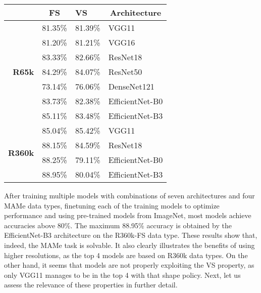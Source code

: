 \documentclass{article}
\begin{document}
\begin{table}[t]
\begin{minipage}{.49\linewidth}
\begin{tabular}{@{}r|l|l|l@{}}
                       & \multicolumn{1}{c}{\textbf{FS}} & \textbf{VS} & \multicolumn{1}{c}{\textbf{Architecture}}  \\ \midrule
\multirow{7}{*}{\textbf{R65k}}  & 81.35\%                     & 81.39\%          & VGG11                            \\
                                & 81.20\%                     & 81.21\%          & VGG16                            \\
                                & 83.33\%                     & 82.66\%          & ResNet18                         \\
                                & 84.29\%                     & 84.07\%          & ResNet50                         \\
                                & 73.14\%                     & 76.06\%          & DenseNet121                      \\
                                & 83.73\%                     & 82.38\%          & EfficientNet-B0                  \\
                                & 85.11\%                     & 83.48\%          & EfficientNet-B3                  \\ \midrule
\multirow{4}{*}{\textbf{R360k}} & 85.04\%                     & 85.42\%          & VGG11                            \\
                                & 88.15\%                     & 84.59\%          & ResNet18                         \\
                                & 88.25\%                     & 79.11\%          & EfficientNet-B0                  \\
                                & 88.95\%                     & 80.04\%          & EfficientNet-B3                                      
\end{tabular}




     \end{minipage}
\end{table}

After training multiple models with combinations of seven architectures and four MAMe data types, finetuning each of the training models to optimize performance and using pre-trained models from ImageNet, most models achieve accuracies above 80\%. The maximum 88.95\% accuracy is obtained by the EfficientNet-B3 architecture on the R360k-FS data type. These results show that, indeed, the MAMe task is solvable. It also clearly illustrates the benefits of using higher resolutions, as the top 4 models are based on R360k data types. On the other hand, it seems that models are not properly exploiting the VS property, as only VGG11 manages to be in the top 4 with that shape policy. Next, let us assess the relevance of these properties in further detail.
\end{document}
